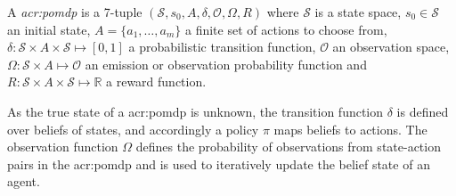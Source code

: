 \begin{definition}
	\label{def:pomdp}
	A \textit{\acrfull{acr:pomdp}} is a 7-tuple $(\mathcal{S}, s_0, A, \delta, \mathcal{O}, \Omega, R)$ where $\mathcal{S}$ is a state space, $s_0 \in \mathcal{S}$ an initial state, $A = \{a_1, \ldots, a_m\}$ a finite set of actions to choose from, $\delta: \mathcal{S} \times A \times \mathcal{S} \mapsto [0, 1]$ a probabilistic transition function, $\mathcal{O}$ an observation space, $\Omega: \mathcal{S}\times A \mapsto \mathcal{O}$ an emission or observation probability function and $R: \mathcal{S} \times A \times \mathcal{S} \mapsto \mathbb{R}$ a reward function.
\end{definition}

As the true state of a \acrshort{acr:pomdp} is unknown, the transition function $\delta$ is defined over beliefs of states, and accordingly a policy $\pi$ maps beliefs to actions.
The observation function $\Omega$ defines the probability of observations from state-action pairs in the \acrshort{acr:pomdp} and is used to iteratively update the belief state of an agent.


